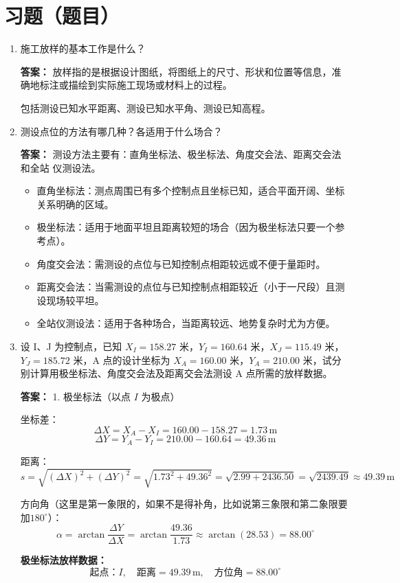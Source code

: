 \documentclass[12pt,a4paper]{article}
\newcounter{question}
\newenvironment{questions}{
    \setcounter{question}{0}
    \section*{习题（题目）}
    \begin{enumerate}[leftmargin=1.5em,label={\arabic*．}]
}{
    \end{enumerate}
}
\newcommand{\answer}[1]{\par\noindent\textbf{答案：} #1\par\vspace{1em}}
\begin{document}
\begin{questions}
    \item 施工放样的基本工作是什么？
    \answer{放样指的是根据设计图纸，将图纸上的尺寸、形状和位置等信息，准确地标注或描绘到实际施工现场或材料上的过程。
    
    包括测设已知水平距离、测设已知水平角、测设已知高程。
    }
    
    \item 测设点位的方法有哪几种？各适用于什么场合？
    \answer{测设方法主要有：直角坐标法、极坐标法、角度交会法、距离交会法和全站
仪测设法。

\begin{itemize}
    \item 直角坐标法：测点周围已有多个控制点且坐标已知，适合平面开阔、坐标关系明确的区域。
    \item 极坐标法：适用于地面平坦且距离较短的场合（因为极坐标法只要一个参考点）。
    \item 角度交会法：需测设的点位与已知控制点相距较远或不便于量距时。
    \item 距离交会法：当需测设的点位与已知控制点相距较近（小于一尺段）且测设现场较平坦。
    \item 全站仪测设法：适用于各种场合，当距离较远、地势复杂时尤为方便。
\end{itemize}
}

    \item 设 I、J 为控制点，已知 \(X_I = 158.27\) 米，\(Y_I = 160.64\) 米，\(X_J = 115.49\) 米，\(Y_J = 185.72\) 米，A 点的设计坐标为 \(X_A = 160.00\) 米，\(Y_A = 210.00\) 米，试分别计算用极坐标法、角度交会法及距离交会法测设 A 点所需的放样数据。

    \answer{
    1. 极坐标法（以点 \(I\) 为极点）

坐标差：
\[
\Delta X = X_A - X_I = 160.00 - 158.27 = 1.73\,\text{m}
\]
\[
\Delta Y = Y_A - Y_I = 210.00 - 160.64 = 49.36\,\text{m}
\]

距离：
\[
s = \sqrt{(\Delta X)^2 + (\Delta Y)^2} = \sqrt{1.73^2 + 49.36^2} = \sqrt{2.99 + 2436.50} = \sqrt{2439.49} \approx 49.39\,\text{m}
\]

方向角（这里是第一象限的，如果不是得补角，比如说第三象限和第二象限要加$180^\circ$）：
\[
\alpha = \arctan \frac{\Delta Y}{\Delta X} = \arctan \frac{49.36}{1.73} \approx \arctan(28.53) =88.00^\circ
\]

\vspace{1em}
\textbf{极坐标法放样数据：}  
\[
\text{起点：} I, \quad \text{距离} = 49.39\,\text{m}, \quad \text{方位角} = 88.00^\circ
\]

}
\end{questions}
\end{document}

